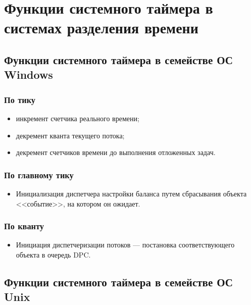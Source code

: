 \setcounter{page}{2}
\chapter{Функции системного таймера в системах разделения времени}

\section{Функции системного таймера в семействе ОС Windows}

\subsection*{По тику}
\begin{itemize}
	\item инкремент счетчика реального времени;
	\item декремент кванта текущего потока;
	\item декремент счетчиков времени до выполнения отложенных задач.
\end{itemize}

\subsection*{По главному тику}
\begin{itemize}
	\item Инициализация диспетчера настройки баланса путем сбрасывания объекта <<событие>>, на котором он ожидает.
\end{itemize}

\subsection*{По кванту}
\begin{itemize}
	\item Инициация диспетчеризации потоков --- постановка соответствующего объекта в очередь DPC.
\end{itemize}



\section{Функции системного таймера в семействе ОС Unix} %

